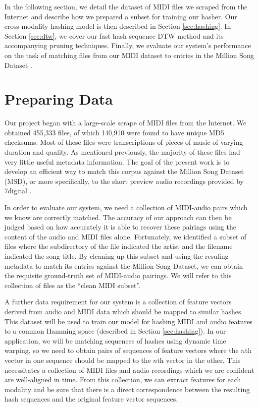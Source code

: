\documentclass{article}
\begin{document}
In the following section, we detail the dataset of MIDI files we scraped from the Internet and describe how we prepared a subset for training our hasher.
Our cross-modality hashing model is then described in Section \ref{sec:hashing}.
In Section \ref{sec:dtw}, we cover our fast hash sequence DTW method and its accompanying pruning techniques.
Finally, we evaluate our system's performance on the task of matching files from our MIDI dataset to entries in the Million Song Dataset \cite{bertin2011million}.

\section{Preparing Data}
\label{sec:dataset}

Our project began with a large-scale scrape of MIDI files from the Internet.
We obtained 455,333 files, of which 140,910 were found to have unique MD5 checksums.
Most of these files were transcriptions of pieces of music of varying duration and quality.
As mentioned previously, the majority of these files had very little useful metadata information.
The goal of the present work is to develop an efficient way to match this corpus against the Million Song Dataset (MSD), or more specifically, to the short preview audio recordings provided by 7digital \cite{schindler2012facilitating}.

In order to evaluate our system, we need a collection of MIDI-audio pairs which we know are correctly matched.
The accuracy of our approach can then be judged based on how accurately it is able to recover these pairings using the content of the audio and MIDI files alone.
Fortunately, we identified a subset of files where the subdirectory of the file indicated the artist and the filename indicated the song title.
By cleaning up this subset and using the resuling metadata to match its entries against the Million Song Dataset, we can obtain the requisite ground-truth set of MIDI-audio pairings.
We will refer to this collection of files as the ``clean MIDI subset''.

A further data requirement for our system is a collection of feature vectors derived from audio and MIDI data which should be mapped to similar hashes.
This dataset will be used to train our model for hashing MIDI and audio features to a common Hamming space (described in Section \ref{sec:hashing}).
In our application, we will be matching sequences of hashes using dynamic time warping, so we need to obtain pairs of sequences of feature vectors where the $n$th vector in one sequence should be mapped to the $n$th vector in the other.
This necessitates a collection of MIDI files and audio recordings which we are confident are well-aligned in time.
From this collection, we can extract features for each modality and be sure that there is a direct correspondence between the resulting hash sequences and the original feature vector sequences.
\end{document}
